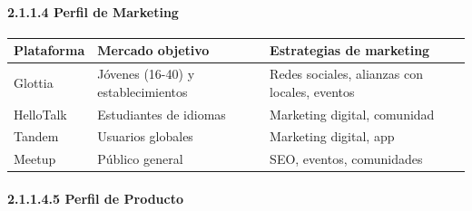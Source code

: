 \paragraph{2.1.1.4 Perfil de
Marketing}\label{report__20-cap2-requirements-analysis.md__perfil-de-marketing}

{\def\LTcaptype{none} %
\begin{longtable}[]{@{}
  >{\raggedright\arraybackslash}p{}
  >{\raggedright\arraybackslash}p{}
  >{\raggedright\arraybackslash}p{}@{}}
\toprule\noalign{}
\begin{minipage}[b]{\linewidth}\raggedright
Plataforma
\end{minipage} & \begin{minipage}[b]{\linewidth}\raggedright
Mercado objetivo
\end{minipage} & \begin{minipage}[b]{\linewidth}\raggedright
Estrategias de marketing
\end{minipage} \\
\midrule\noalign{}
\endhead
\bottomrule\noalign{}
\endlastfoot
Glottia & Jóvenes (16-40) y establecimientos & Redes sociales, alianzas
con locales, eventos \\
HelloTalk & Estudiantes de idiomas & Marketing digital, comunidad \\
Tandem & Usuarios globales & Marketing digital, app \\
Meetup & Público general & SEO, eventos, comunidades \\
\end{longtable}
}

\paragraph{2.1.1.4.5 Perfil de
Producto}\label{report__20-cap2-requirements-analysis.md__perfil-de-producto}

